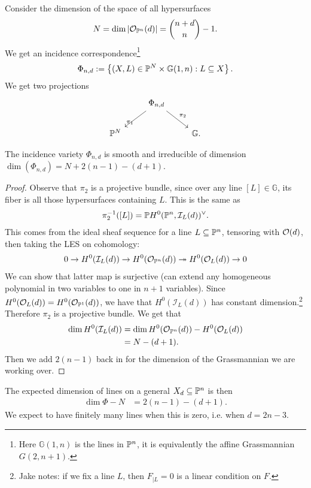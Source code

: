 \documentclass[11pt]{amsart}
\begin{document}
Consider the dimension of the space of all hypersurfaces
\begin{align*}
    N = \dim \left| \O_{\P^n}(d) \right| = \binom{n+d}{n}-1.
\end{align*}
We get an incidence correspondence\footnote{Here $\mathbb{G}(1,n)$ is the lines in $\P^n$, it is equivalently the affine Grassmannian $G(2,n+1)$.}
\begin{align*}
    \Phi_{n,d}:= \left\{ (X,L) \in \P^N \times \mathbb{G}(1,n) : L \subseteq X \right\}.
\end{align*}
We get two projections
\[ \begin{tikzcd}
     & \Phi_{n,d}\ar[dl,"\pi_1" below left]\ar[dr,"\pi_2" above right] & \\
    \mathbb{P}^N &  & \mathbb{G}.
\end{tikzcd} \]
%
\begin{proposition} The incidence variety $\Phi_{n,d}$ is smooth and irreducible of dimension $\dim(\Phi_{n,d}) = N + 2(n-1) - (d+1)$.
\end{proposition}
\begin{proof} Observe that $\pi_2$ is a projective bundle, since over any line $[L] \in \mathbb{G}$, its fiber is all those hypersurfaces containing $L$. This is the same as
\begin{align*}
    \pi_2^{-1}([L]) = \mathbb{P} H^0(\P^n, \mathcal{I}_L(d))^\vee.
\end{align*}
This comes from the ideal sheaf sequence for a line $L \subseteq \P^n$, tensoring with $\O(d)$, then taking the LES on cohomology:
\begin{align*}
    0 \to H^0(\mathcal{I}_L(d)) \to H^0(\O_{\P^n}(d)) \tto H^0(\O_L(d)) \to 0
\end{align*}
We can show that latter map is surjective (can extend any homogeneous polynomial in two variables to one in $n+1$ variables). Since $H^0(\O_L(d)) = H^0(\O_{\P^1}(d))$, we have that $H^0(\mathcal{I}_L(d))$ has constant dimension.\footnote{Jake notes: if we fix a line $L$, then $F_{|L}=0$ is a linear condition on $F$.} Therefore $\pi_2$ is a projective bundle. We get that
\begin{align*}
    \dim H^0(\mathcal{I}_L(d)) &= \dim H^0(\O_{\P^n}(d)) - H^0(\O_L(d)) \\
    &= N - (d+1).
\end{align*}
Then we add $2(n-1)$ back in for the dimension of the Grassmannian we are working over.
\end{proof}

The expected dimension of lines on a general $X_d \subseteq \P^n$ is then
\begin{align*}
    \dim \Phi - N &= 2(n-1) - (d+1).
\end{align*}
%
We expect to have finitely many lines when this is zero, i.e. when $d = 2n-3$.
\end{document}
